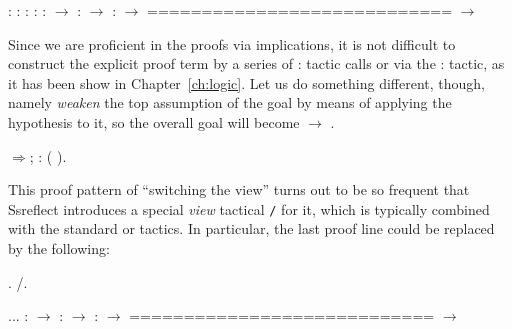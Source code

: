 \coqdoceol
\coqdocemptyline
\coqdocindent{1.00em}
 : \coqdoceol
\coqdocindent{1.00em}
 : \coqdoceol
\coqdocindent{1.00em}
 : \coqdoceol
\coqdocindent{1.00em}
 : \coqdoceol
\coqdocindent{1.00em}
 :  \ensuremath{\rightarrow} \coqdoceol
\coqdocindent{1.00em}
 :  \ensuremath{\rightarrow} \coqdoceol
\coqdocindent{1.00em}
 :  \ensuremath{\rightarrow} \coqdoceol
\coqdocindent{1.00em}
============================\coqdoceol
\coqdocindent{1.50em}
 \ensuremath{\rightarrow} 

\coqdocemptyline


Since we are proficient in the proofs via implications, it is not
difficult to construct the explicit proof term by a series of :
tactic calls or via the : tactic, as it has been show in
Chapter~\ref{ch:logic}. Let us do something different, though,
namely \textit{weaken} the top assumption of the goal by means of applying
the hypothesis  to it, so the overall goal will become  \ensuremath{\rightarrow} .


\begin{coqdoccode}
\coqdocemptyline
\coqdocnoindent
{}\ensuremath{\Rightarrow}; : ( ).\coqdoceol
\coqdocemptyline
\end{coqdoccode}


This proof pattern of ``switching the view'' turns out to be so frequent
that Ssreflect introduces a special \textit{view} tactical \texttt{/} for
it, which is typically combined with the standard  or 
tactics. In particular, the last proof line could be replaced by the
following:


\begin{coqdoccode}
\coqdocemptyline
\coqdocnoindent
{}.\coqdoceol
\coqdocnoindent
{}/.\coqdoceol
\coqdocemptyline
\end{coqdoccode}


\coqdoceol
\coqdocemptyline
\coqdocindent{1.00em}
...\coqdoceol
\coqdocindent{1.00em}
 :  \ensuremath{\rightarrow} \coqdoceol
\coqdocindent{1.00em}
 :  \ensuremath{\rightarrow} \coqdoceol
\coqdocindent{1.00em}
 :  \ensuremath{\rightarrow} \coqdoceol
\coqdocindent{1.00em}
============================\coqdoceol
\coqdocindent{1.50em}
 \ensuremath{\rightarrow} 

